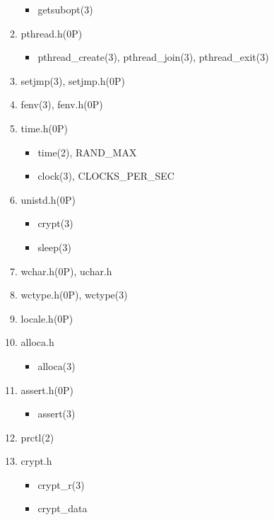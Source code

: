 \documentclass{article}
\begin{document}
\begin{enumerate}
\begin{enumerate}
\begin{itemize}
                    \item getsubopt(3)
                \end{itemize}
            \item pthread.h(0P)
                \begin{itemize}
                    \item pthread_create(3), pthread_join(3), pthread_exit(3)
                \end{itemize}
            \item setjmp(3), setjmp.h(0P)
            \item fenv(3), fenv.h(0P)
            \item time.h(0P)
                \begin{itemize}
                    \item time(2), RAND_MAX
                    \item clock(3), CLOCKS_PER_SEC
                \end{itemize}
            \item unistd.h(0P)
                \begin{itemize}
                    \item crypt(3)
                    \item sleep(3)
                \end{itemize}
            \item wchar.h(0P), uchar.h
            \item wctype.h(0P), wctype(3)
            \item locale.h(0P)
            \item alloca.h
                \begin{itemize}
                    \item alloca(3)
                \end{itemize}
            \item assert.h(0P)
                \begin{itemize}
                    \item assert(3)
                \end{itemize}
            \item prctl(2)
            \item crypt.h
                \begin{itemize}
                    \item crypt_r(3)
                    \item crypt_data
                \end{itemize}

\end{enumerate}
\end{enumerate}
\end{document}
